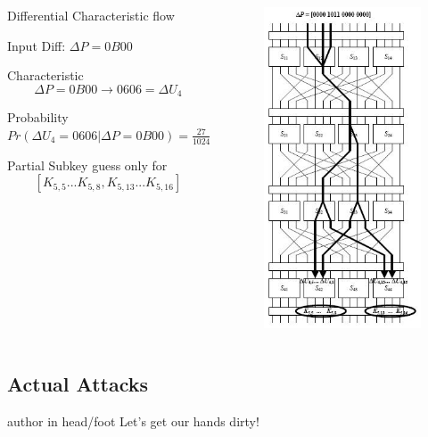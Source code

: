 \documentclass[9pt]{beamer}
\begin{document}
\begin{frame}
\begin{columns}
\begin{column}{0.6\textwidth}
Differential Characteristic flow

Input Diff: $\Delta P = 0B00$ 

Characteristic
\[ \Delta P = 0B00 \rightarrow 0606 = \Delta U_4 \]

Probability $Pr(\Delta U_4 = 0606 | \Delta P = 0B00) = \frac{27}{1024}$

Partial Subkey guess only for
\[ [K_{5,5} ... K_{5,8}, K_{5,13} ... K_{5,16}] \]
\end{column}

\begin{column}{0.4\textwidth}
\begin{figure}
\includegraphics[totalheight=0.8\textheight]{spn_diff_char.jpg}
\end{figure}
\end{column}
\end{columns}

\end{frame}

\subsection{Actual Attacks}
\begin{frame}
\begin{beamercolorbox}[ht=2.5ex,dp=1.125ex,center,rounded=true,shadow=true]{author in head/foot}
Let's get our hands dirty!
\end{beamercolorbox}
\end{frame}
\end{document}
